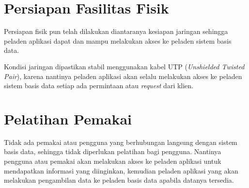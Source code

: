 \section{Persiapan Fasilitas Fisik}

Persiapan fisik pun telah dilakukan diantaranya kesiapan jaringan sehingga peladen aplikasi dapat dan mampu melakukan akses ke peladen sistem basis data.

Kondisi jaringan dipastikan stabil menggunakan kabel UTP (\textit{Unshielded Twisted Pair}), karena nantinya peladen aplikasi akan selalu melakukan akses ke peladen sistem basis data setiap ada permintaan atau \textit{request} dari klien.

\section{Pelatihan Pemakai}

Tidak ada pemakai atau pengguna yang berhubungan langsung dengan sistem basis data, sehingga tidak diperlukan pelatihan bagi pengguna. Nantinya pengguna atau pemakai akan melakukan akses ke peladen aplikasi untuk mendapatkan informasi yang diinginkan, kemudian peladen aplikasi yang akan melakukan pengambilan data ke peladen basis data apabila datanya tersedia.